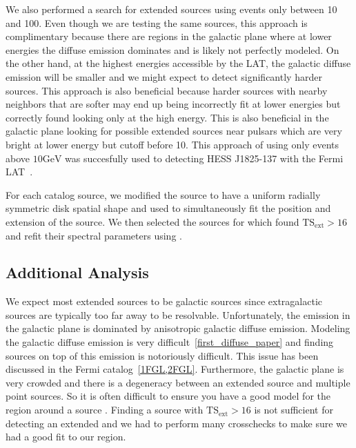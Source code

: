 \documentclass[preprint]{aastex}
\newcommand{\gev}{\text{GeV}\xspace}
\newcommand{\tsext}{{\ensuremath{\text{TS}_\text{ext}}}\xspace}
\newcommand{\pointlike}{\text{\em pointlike}\xspace}
\newcommand{\gtlike}{\text{\em gtlike}\xspace}
\begin{document}
We also performed a search for extended sources using events only between
10\gev and 100\gev. Even though we are testing the same sources, this
approach is complimentary because there are regions in the galactic
plane where at lower energies the diffuse emission dominates and is
likely not perfectly modeled. On the other hand, at the highest energies
accessible by the LAT, the galactic diffuse emission will be smaller and
we might expect to detect significantly harder sources. This approach is
also beneficial because harder sources with nearby neighbors that are
softer may end up being incorrectly fit at lower energies but correctly
found looking only at the high energy.  This is also beneficial in the
galactic plane looking for possible extended sources near pulsars which
are very bright at lower energy but cutoff before 10\gev.  This approach
of using only events above $10\gev$ was succesfully used to detecting
HESS J1825-137 with the Fermi LAT~\cite{HESS J1825 paper}.

For each catalog source, we modified the source to have a uniform radially
symmetric disk spatial shape and used \pointlike to simultaneously fit
the position and extension of the source.  We then selected the sources
for which \pointlike found $\tsext>16$ and refit their spectral parameters
using \gtlike.


\subsection{Additional Analysis}

We expect most extended sources to be galactic sources since extragalactic
sources are typically too far away to be resolvable. Unfortunately,
the \gev emission in the galactic plane is dominated by anisotropic
galactic diffuse emission.  Modeling the galactic diffuse emission is
very difficult~\ref{first_diffuse_paper}  and finding sources on top of
this emission is notoriously difficult. This issue has been discussed
in the Fermi catalog~\ref{1FGL,2FGL}. Furthermore, the galactic plane
is very crowded and there is a degeneracy between an extended source
and multiple point sources. So it is often difficult to ensure you have
a good model for the region around a source .  Finding a source with
$\tsext>16$ is not sufficient for detecting an extended and we had to
perform many crosschecks to make sure we had a good fit to our region.

\end{document}
